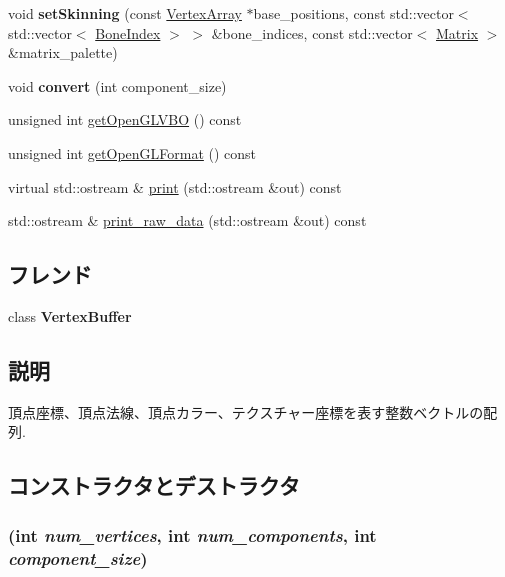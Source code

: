 \begin{CompactItemize}
\item 
\hypertarget{classm3g_1_1VertexArray_fcfcc1258ce0be7d0322d2e00809e1ea}{
void \textbf{setSkinning} (const \hyperlink{classm3g_1_1VertexArray}{VertexArray} $\ast$base\_\-positions, const std::vector$<$ std::vector$<$ \hyperlink{structm3g_1_1BoneIndex}{BoneIndex} $>$ $>$ \&bone\_\-indices, const std::vector$<$ \hyperlink{classm3g_1_1Matrix}{Matrix} $>$ \&matrix\_\-palette)}
\label{classm3g_1_1VertexArray_fcfcc1258ce0be7d0322d2e00809e1ea}

\item 
\hypertarget{classm3g_1_1VertexArray_5c2359d08265a9f8605316789c40ece4}{
void \textbf{convert} (int component\_\-size)}
\label{classm3g_1_1VertexArray_5c2359d08265a9f8605316789c40ece4}

\item 
unsigned int \hyperlink{classm3g_1_1VertexArray_720ecee697dbf11d5f90dc998817b39d}{getOpenGLVBO} () const 
\item 
unsigned int \hyperlink{classm3g_1_1VertexArray_3e28ae5596cde78a980de02005a136f2}{getOpenGLFormat} () const 
\item 
virtual std::ostream \& \hyperlink{classm3g_1_1VertexArray_6fea17fa1532df3794f8cb39cb4f911f}{print} (std::ostream \&out) const 
\item 
std::ostream \& \hyperlink{classm3g_1_1VertexArray_85d61f1cdd10b3b5126cdb20291ae276}{print\_\-raw\_\-data} (std::ostream \&out) const 
\end{CompactItemize}
\subsection*{フレンド}
\begin{CompactItemize}
\item 
\hypertarget{classm3g_1_1VertexArray_9ef9a3db41cb54690169922706e1d3c5}{
class \textbf{VertexBuffer}}
\label{classm3g_1_1VertexArray_9ef9a3db41cb54690169922706e1d3c5}

\end{CompactItemize}


\subsection{説明}
頂点座標、頂点法線、頂点カラー、テクスチャー座標を表す整数ベクトルの配列. 

\subsection{コンストラクタとデストラクタ}
\hypertarget{classm3g_1_1VertexArray_5f38e30d23b5dc34b223e749e8afd0d0}{
\subsubsection[{VertexArray}]{ (int {\em num\_\-vertices}, \/  int {\em num\_\-components}, \/  int {\em component\_\-size})}}
\label{classm3g_1_1VertexArray_5f38e30d23b5dc34b223e749e8afd0d0}


